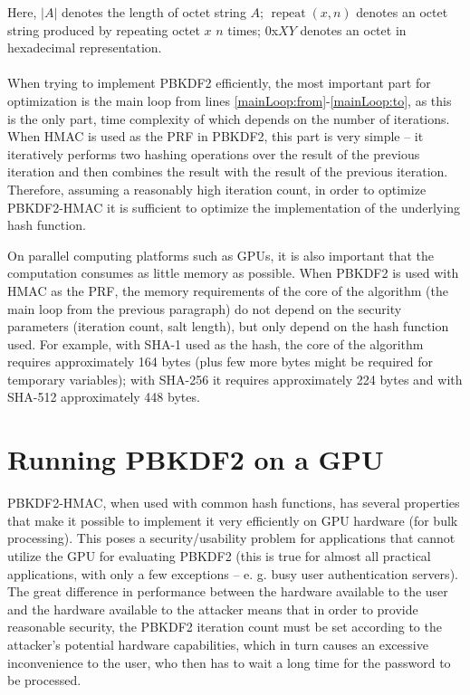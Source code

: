 \documentclass[12pt,oneside]{fithesis2}
\begin{document}
      Here, $|A|$ denotes the length of octet string $A$; $\operatorname{repeat}(x, n)$ denotes an octet string produced by repeating octet $x$ $n$ times; 0x$XY$ denotes an octet in hexadecimal representation.
      
      \paragraph*{}
      When trying to implement PBKDF2 efficiently, the most important part for optimization is the main loop from lines \ref{mainLoop:from}-\ref{mainLoop:to}, as this is the only part, time complexity of which depends on the number of iterations. When HMAC is used as the PRF in PBKDF2, this part is very simple -- it iteratively performs two hashing operations over the result of the previous iteration and then combines the result with the result of the previous iteration. Therefore, assuming a reasonably high iteration count, in order to optimize PBKDF2-HMAC it is sufficient to optimize the implementation of the underlying hash function.
      
      On parallel computing platforms such as GPUs, it is also important that the computation consumes as little memory as possible. When PBKDF2 is used with HMAC as the PRF, the memory requirements of the core of the algorithm (the main loop from the previous paragraph) do not depend on the security parameters (iteration count, salt length), but only depend on the hash function used. For example, with SHA-1 used as the hash, the core of the algorithm requires approximately 164 bytes (plus few more bytes might be required for temporary variables); with SHA-256 it requires approximately 224 bytes and with SHA-512 approximately 448 bytes.
      
      \section{Running PBKDF2 on a GPU} \label{s:PBKDF2onGPU}
      PBKDF2-HMAC, when used with common hash functions, has several properties that make it possible to implement it very efficiently on GPU hardware (for bulk processing). This poses a security/usability problem for applications that cannot utilize the GPU for evaluating PBKDF2 (this is true for almost all practical applications, with only a few exceptions -- e. g. busy user authentication servers). The great difference in performance between the hardware available to the user and the hardware available to the attacker means that in order to provide reasonable security, the PBKDF2 iteration count must be set according to the attacker's potential hardware capabilities, which in turn causes an excessive inconvenience to the user, who then has to wait a long time for the password to be processed.
      
\end{document}
